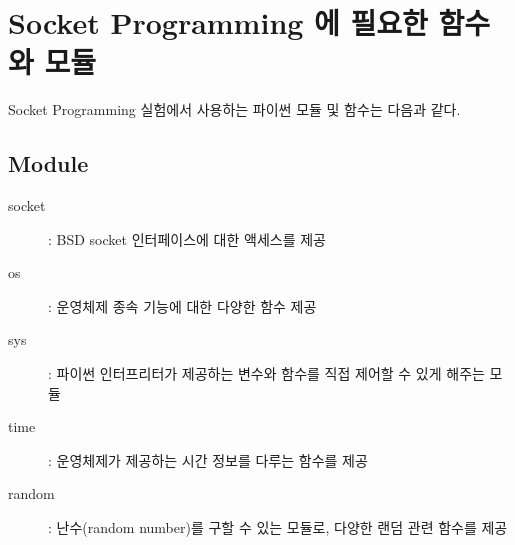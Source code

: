 \section{Socket Programming 에 필요한 함수와 모듈}
Socket Programming 실험에서 사용하는 파이썬 모듈 및 함수는 다음과 같다.

\subsection{Module}
\begin{description}
    \item[socket] : BSD socket 인터페이스에 대한 액세스를 제공 \vspace{-1mm}
    \item[os] : 운영체제 종속 기능에 대한 다양한 함수 제공 \vspace{-1mm}
    \item[sys] : 파이썬 인터프리터가 제공하는 변수와 함수를 직접 제어할 수 있게 해주는 모듈 \vspace{-1mm}
    \item[time] : 운영체제가 제공하는 시간 정보를 다루는 함수를 제공 \vspace{-1mm}
    \item[random] : 난수(random number)를 구할 수 있는 모듈로, 다양한 랜덤 관련 함수를 제공 \vspace{-1mm}
\end{description}
